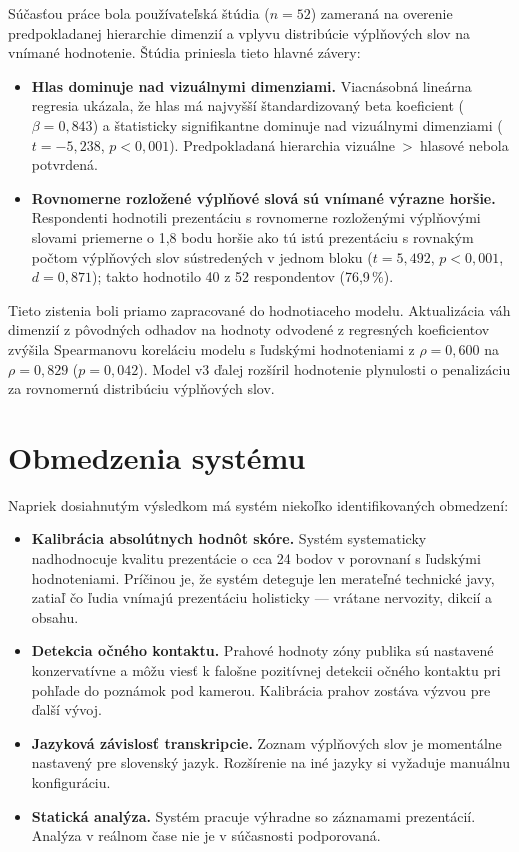 Súčasťou práce bola používateľská štúdia ($n = 52$) zameraná na overenie predpokladanej hierarchie dimenzií a vplyvu distribúcie výplňových slov na vnímané hodnotenie. Štúdia priniesla tieto hlavné závery:

\begin{itemize}
    \item \textbf{Hlas dominuje nad vizuálnymi dimenziami.} Viacnásobná lineárna regresia ukázala, že hlas má najvyšší štandardizovaný beta koeficient ($\beta = 0{,}843$) a štatisticky signifikantne dominuje nad vizuálnymi dimenziami ($t = -5{,}238$, $p < 0{,}001$). Predpokladaná hierarchia vizuálne~>~hlasové nebola potvrdená.
    \item \textbf{Rovnomerne rozložené výplňové slová sú vnímané výrazne horšie.} Respondenti hodnotili prezentáciu s rovnomerne rozloženými výplňovými slovami priemerne o 1,8 bodu horšie ako tú istú prezentáciu s rovnakým počtom výplňových slov sústredených v jednom bloku ($t = 5{,}492$, $p < 0{,}001$, $d = 0{,}871$); takto hodnotilo 40 z 52 respondentov (76,9\,\%).
\end{itemize}

Tieto zistenia boli priamo zapracované do hodnotiaceho modelu. Aktualizácia váh dimenzií z pôvodných odhadov na hodnoty odvodené z regresných koeficientov zvýšila Spearmanovu koreláciu modelu s ľudskými hodnoteniami z $\rho = 0{,}600$ na $\rho = 0{,}829$ ($p = 0{,}042$). Model v3 ďalej rozšíril hodnotenie plynulosti o penalizáciu za rovnomernú distribúciu výplňových slov.

\section{Obmedzenia systému}

Napriek dosiahnutým výsledkom má systém niekoľko identifikovaných obmedzení:

\begin{itemize}
    \item \textbf{Kalibrácia absolútnych hodnôt skóre.} Systém systematicky nadhodnocuje kvalitu prezentácie o cca 24 bodov v porovnaní s ľudskými hodnoteniami. Príčinou je, že systém deteguje len merateľné technické javy, zatiaľ čo ľudia vnímajú prezentáciu holisticky --- vrátane nervozity, dikcií a obsahu.
    \item \textbf{Detekcia očného kontaktu.} Prahové hodnoty zóny publika sú nastavené konzervatívne a môžu viesť k falošne pozitívnej detekcii očného kontaktu pri pohľade do poznámok pod kamerou. Kalibrácia prahov zostáva výzvou pre ďalší vývoj.
    \item \textbf{Jazyková závislosť transkripcie.} Zoznam výplňových slov je momentálne nastavený pre slovenský jazyk. Rozšírenie na iné jazyky si vyžaduje manuálnu konfiguráciu.
    \item \textbf{Statická analýza.} Systém pracuje výhradne so záznamami prezentácií. Analýza v reálnom čase nie je v súčasnosti podporovaná.
\end{itemize}

